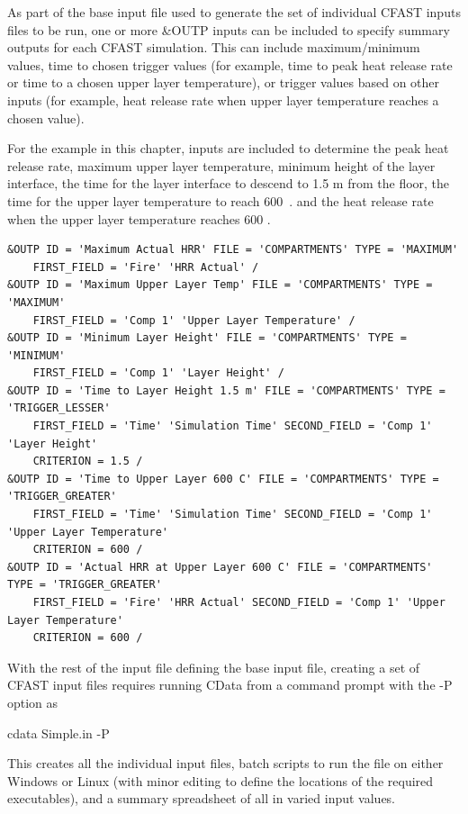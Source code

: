 \documentclass[12pt,twoside]{book}
\begin{document}
As part of the base input file used to generate the set of individual CFAST inputs files to be run, one or more {\ct \&OUTP} inputs can be included to specify summary outputs for each CFAST simulation. This can include maximum/minimum values, time to chosen trigger values (for example, time to peak heat release rate or time to a chosen upper layer temperature), or trigger values based on other inputs (for example, heat release rate when upper layer temperature reaches a chosen value).

For the example in this chapter, inputs are included to determine the peak heat release rate, maximum upper layer temperature, minimum height of the layer interface, the time for the layer interface to descend to 1.5 m from the floor, the time for the upper layer temperature to reach 600~\degc. and the heat release rate when the upper layer temperature reaches 600 \degc.

\begin{lstlisting}[language=cdata, basicstyle=\scriptsize]
&OUTP ID = 'Maximum Actual HRR' FILE = 'COMPARTMENTS' TYPE = 'MAXIMUM'
    FIRST_FIELD = 'Fire' 'HRR Actual' /
&OUTP ID = 'Maximum Upper Layer Temp' FILE = 'COMPARTMENTS' TYPE = 'MAXIMUM'
    FIRST_FIELD = 'Comp 1' 'Upper Layer Temperature' /
&OUTP ID = 'Minimum Layer Height' FILE = 'COMPARTMENTS' TYPE = 'MINIMUM'
    FIRST_FIELD = 'Comp 1' 'Layer Height' /
&OUTP ID = 'Time to Layer Height 1.5 m' FILE = 'COMPARTMENTS' TYPE = 'TRIGGER_LESSER'
    FIRST_FIELD = 'Time' 'Simulation Time' SECOND_FIELD = 'Comp 1' 'Layer Height' 
    CRITERION = 1.5 /
&OUTP ID = 'Time to Upper Layer 600 C' FILE = 'COMPARTMENTS' TYPE = 'TRIGGER_GREATER'
    FIRST_FIELD = 'Time' 'Simulation Time' SECOND_FIELD = 'Comp 1' 'Upper Layer Temperature' 
    CRITERION = 600 /
&OUTP ID = 'Actual HRR at Upper Layer 600 C' FILE = 'COMPARTMENTS' TYPE = 'TRIGGER_GREATER'
    FIRST_FIELD = 'Fire' 'HRR Actual' SECOND_FIELD = 'Comp 1' 'Upper Layer Temperature' 
    CRITERION = 600 /
\end{lstlisting}

With the rest of the input file defining the base input file, creating a set of CFAST input files requires running CData from a command prompt with the {\ct -P} option as

{\ct cdata Simple.in -P}

This creates all the individual input files, batch scripts to run the file on either Windows or Linux (with minor editing to define the locations of the required executables), and a summary spreadsheet of all in varied input values.
\end{document}
